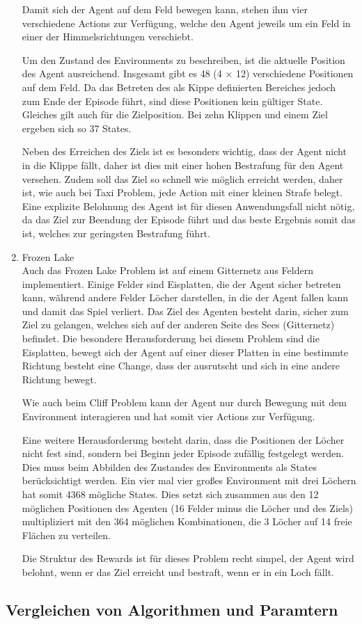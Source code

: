\begin{enumerate}
    Damit sich der Agent auf dem Feld bewegen kann, stehen ihm vier verschiedene Actions zur Verfügung, welche den Agent jeweils um ein Feld in einer der Himmelsrichtungen verschiebt.

    Um den Zustand des Environments zu beschreiben, ist die aktuelle Position des Agent ausreichend. Insgesamt gibt es 48 (4 × 12) verschiedene Positionen auf dem Feld. Da das Betreten des als Kippe definierten Bereiches jedoch zum Ende der Episode führt, sind diese Positionen kein gültiger State. Gleiches gilt auch für die Zielposition. Bei zehn Klippen und einem Ziel ergeben sich so 37 States.

    Neben des Erreichen des Ziels ist es besonders wichtig, dass der Agent nicht in die Klippe fällt, daher ist dies mit einer hohen Bestrafung für den Agent versehen. Zudem soll das Ziel so schnell wie möglich erreicht werden, daher ist, wie auch bei Taxi Problem, jede Action mit einer kleinen Strafe belegt. Eine explizite Belohnung des Agent ist für diesen Anwendungsfall nicht nötig, da das Ziel zur Beendung der Episode führt und das beste Ergebnis somit das ist, welches zur geringsten Bestrafung führt.

    \item Frozen Lake\\
    Auch das Frozen Lake Problem ist auf einem Gitternetz aus Feldern implementiert. Einige Felder sind Eisplatten, die der Agent sicher betreten kann, während andere Felder Löcher darstellen, in die der Agent fallen kann und damit das Spiel verliert. Das Ziel des Agenten besteht darin, sicher zum Ziel zu gelangen, welches sich auf der anderen Seite des Sees (Gitternetz) befindet. Die besondere Herausforderung bei diesem Problem sind die Eisplatten, bewegt sich der Agent auf einer dieser Platten in eine bestimmte Richtung besteht eine Change, dass der ausrutscht und sich in eine andere Richtung bewegt.

    Wie auch beim Cliff Problem kann der Agent nur durch Bewegung mit dem Environment interagieren und hat somit vier Actions zur Verfügung.

    Eine weitere Herausforderung besteht darin, dass die Positionen der Löcher nicht fest sind, sondern bei Beginn jeder Episode zufällig festgelegt werden. Dies muss beim Abbilden des Zustandes des Environments als States berücksichtigt werden. Ein vier mal vier großes Environment mit drei Löchern hat somit 4368 mögliche States. Dies setzt sich zusammen aus den 12 möglichen Positionen des Agenten (16 Felder minus die Löcher und des Ziels) multipliziert mit den 364 möglichen Kombinationen, die 3 Löcher auf 14 freie Flächen zu verteilen.

    Die Struktur des Rewards ist für dieses Problem recht simpel, der Agent wird belohnt, wenn er das Ziel erreicht und bestraft, wenn er in ein Loch fällt.
    
\end{enumerate}

\subsection{Vergleichen von Algorithmen und Paramtern}

